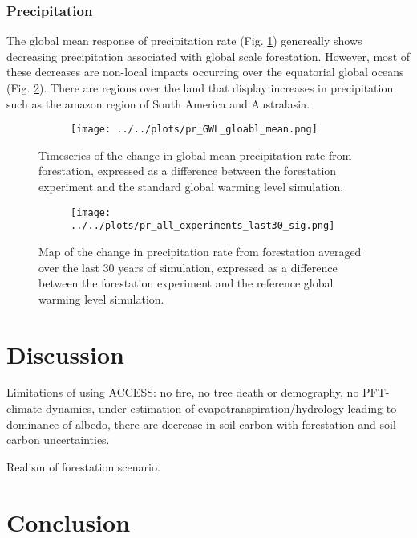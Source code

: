 \documentclass[]{article}
\begin{document}
\subsubsection{Precipitation}

The global mean response of precipitation rate (Fig. \ref{fig:global_pr_timeseries})
genereally shows decreasing precipitation associated with global scale forestation.
However, most of these decreases are non-local impacts occurring over the equatorial global oceans (Fig. \ref{fig:pr_map}).
There are regions over the land that display increases in precipitation such as the amazon region of South America and Australasia.

\begin{figure}[H]
    \centering
    \begin{subfigure}[b]{\linewidth}
        \texttt{[image: ../../plots/pr\_GWL\_gloabl\_mean.png]}
    \end{subfigure}
    \caption{Timeseries of the change in global mean precipitation rate from forestation, expressed as a difference between the forestation experiment and the standard global warming level simulation.}
    \label{fig:global_pr_timeseries}
\end{figure}

\begin{figure}[H]
    \centering
    \begin{subfigure}[b]{\linewidth}
        \texttt{[image: ../../plots/pr\_all\_experiments\_last30\_sig.png]}
    \end{subfigure}
    \caption{Map of the change in precipitation rate from forestation averaged over the last 30 years of simulation, expressed as a difference between the forestation experiment and the reference global warming level simulation.}
    \label{fig:pr_map}
\end{figure}

\section{Discussion}

Limitations of using ACCESS: no fire, no tree death or demography, no PFT-climate dynamics, under estimation of evapotranspiration/hydrology leading to dominance of albedo, there are decrease in soil carbon with forestation and soil carbon uncertainties.

Realism of forestation scenario.

\section{Conclusion}
\end{document}
